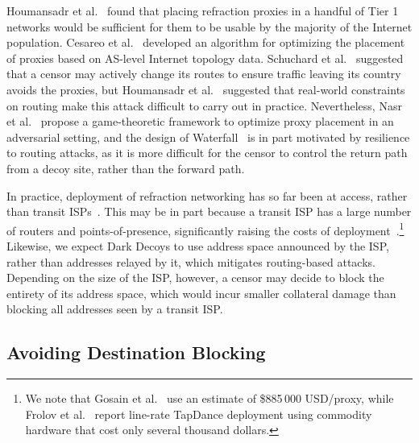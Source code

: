 Houmansadr et al.~\cite{cirripede11} found that placing refraction proxies in a handful of Tier 1 networks would be sufficient for them to be usable by the majority of the Internet population. Cesareo et al.~\cite{decoy-placement} developed an algorithm for optimizing the placement of proxies based on AS-level Internet topology data. Schuchard et al.~\cite{rad} suggested that a censor may actively change its routes to ensure traffic leaving its country avoids the proxies, but Houmansadr et al.~\cite{true-cost-rad} suggested that real-world constraints on routing make this attack difficult to carry out in practice. Nevertheless, Nasr et al.~\cite{game-of-decoys} propose a game-theoretic framework to optimize proxy placement in an adversarial setting, and the design of Waterfall~\cite{waterfall17} is in part motivated by resilience to routing attacks, as it is more difficult for the censor to control the return path from a decoy site, rather than the forward path.

In practice, deployment of refraction networking has so far been at access, rather than transit ISPs~\cite{frolov2017isp}. This may be in part because a transit ISP has a large number of routers and points-of-presence, significantly raising the costs of deployment~\cite{devil-details}.\footnote{We
note that Gosain et al.~\cite{devil-details} use an estimate of \$885\,000 USD/proxy, while Frolov et al.~\cite{frolov2017isp} report line-rate TapDance deployment using commodity hardware that cost only several thousand dollars.} Likewise, we expect Dark Decoys to use address space announced by the ISP, rather than addresses relayed by it, which mitigates routing-based attacks. Depending on the size of the ISP, however, a censor may decide to block the entirety of its address space, which would incur smaller collateral damage than blocking all addresses seen by a transit ISP.

\subsection{Avoiding Destination Blocking}

